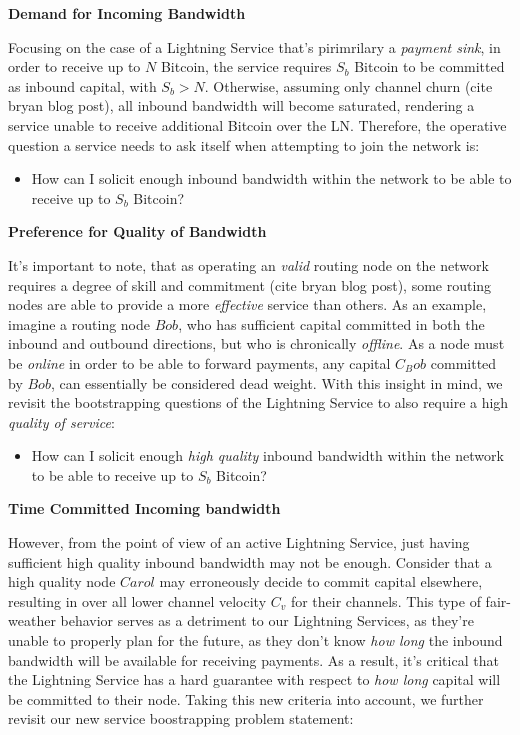 \documentclass[12pt,a4paper]{article}
\theoremstyle{definition}
\begin{document}
\begin{center}
	\textbf{Demand for Incoming Bandwidth}
\end{center}

Focusing on the case of a Lightning Service that's pirimrilary a \emph{payment
sink}, in order to receive up to $N$ Bitcoin, the service requires $S_b$
Bitcoin to be committed as inbound capital, with $S_b > N$. Otherwise, assuming
only channel churn (cite bryan blog post), all inbound bandwidth will become
saturated, rendering a service unable to receive additional Bitcoin over the
LN. Therefore, the operative question a service needs to ask itself when
attempting to join the network is:

\begin{itemize}
        \item How can I solicit enough inbound bandwidth within the network to
            be able to receive up to $S_b$ Bitcoin?
\end{itemize}


\begin{center}
	\textbf{Preference for Quality of Bandwidth}
\end{center}

It's important to note, that as operating an \emph{valid} routing node on the
network requires a degree of skill and commitment (cite bryan blog post), some
routing nodes are able to provide a more \emph{effective} service than others.
As an example, imagine a routing node $Bob$, who has sufficient capital
committed in both the inbound and outbound directions, but who is
chronically \emph{offline}. As a node must be \emph{online} in order to be able
to forward payments, any capital $C_Bob$ committed by $Bob$, can essentially be
considered dead weight. With this insight in mind, we revisit the bootstrapping
questions of the Lightning Service to also require a high \emph{quality of
service}:

\begin{itemize}
        \item How can I solicit enough \emph{high quality} inbound bandwidth
            within the network to be able to receive up to $S_b$ Bitcoin?
\end{itemize}

\begin{center}
	\textbf{Time Committed Incoming bandwidth}
\end{center}


However, from the point of view of an active Lightning Service, just having
sufficient high quality inbound bandwidth may not be enough. Consider that a
high quality node $Carol$ may erroneously decide to commit capital elsewhere,
resulting in over all lower channel velocity $C_v$ for their channels. This
type of fair-weather behavior serves as a detriment to our Lightning Services,
as they're unable to properly plan for the future, as they don't know \emph{how
long} the inbound bandwidth will be available for receiving payments. As a
result, it's critical that the Lightning Service has a hard guarantee with
respect to \emph{how long} capital will be committed to their node. Taking this
new criteria into account, we further revisit our new service boostrapping
problem statement:
\end{document}
